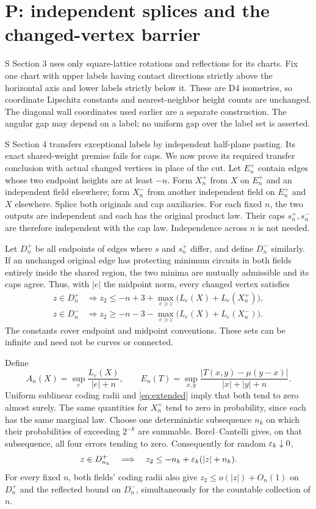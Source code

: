 \section{P: independent splices and the changed-vertex barrier}\label{sec:splice}
S Section 3 uses only square-lattice rotations and reflections for its charts.
Fix one chart with upper labels having contact directions strictly above
the horizontal axis and lower labels strictly below it. These are D4
isometries, so coordinate Lipschitz constants and nearest-neighbor height
counts are unchanged. The diagonal wall coordinates used earlier are a
separate construction. The angular gap may depend on a label; no uniform
gap over the label set is asserted.

S Section 4 transfers exceptional labels by independent half-plane pasting.
Its exact shared-weight premise fails for caps. We now prove its required
transfer conclusion with actual changed vertices in place of the cut.
Let $E_n^+$ contain edges whose two endpoint heights are at least $-n$.
Form $X_n^+$ from $X$ on $E_n^+$ and an independent field elsewhere; form
$X_n^-$ from another independent field on $E_n^+$ and $X$ elsewhere.
Splice both originals and cap auxiliaries. For each fixed $n$, the two outputs
are independent and each has the original product law. Their caps $s_n^+,s_n^-$
are therefore independent with the cap law. Independence across $n$ is not needed.

Let $D_n^+$ be all endpoints of edges where $s$ and $s_n^+$ differ, and
define $D_n^-$ similarly. If an unchanged original edge has protecting
minimum circuits in both fields entirely inside the shared region, the
two minima are mutually admissible and its caps agree. Thus, with $|e|$
the midpoint norm, every changed vertex satisfies
\begin{align}
 z\in D_n^+&\Longrightarrow z_2\le-n+3+
       \max_{e\ni z}\big(L_e(X)+L_e(X_n^+)\big),\label{eq:band}\\
 z\in D_n^-&\Longrightarrow z_2\ge-n-3-
       \max_{e\ni z}\big(L_e(X)+L_e(X_n^-)\big).\nonumber
\end{align}
The constants cover endpoint and midpoint conventions. These sets can be
infinite and need not be curves or connected.

Define
\[
 A_n(X)=\sup_e\frac{L_e(X)}{|e|+n},\qquad
 E_n(T)=\sup_{x,y}\frac{|T(x,y)-\mu(y-x)|}{|x|+|y|+n}.
\]
Uniform sublinear coding radii and \eqref{eq:extended} imply that both tend
to zero almost surely. The same quantities for $X_n^+$ tend to zero in
probability, since each has the same marginal law. Choose one deterministic
subsequence $n_k$ on which their probabilities of exceeding $2^{-k}$ are
summable. Borel--Cantelli gives, on that subsequence, all four errors tending
to zero. Consequently for random $\varepsilon_k\downarrow0$,
\begin{equation}\label{eq:movingband}
 z\in D_{n_k}^+\quad\Longrightarrow\quad
 z_2\le-n_k+\varepsilon_k(|z|+n_k).
\end{equation}
For every fixed $n$, both fields' coding radii also give
$z_2\le o(|z|)+O_n(1)$ on $D_n^+$ and the reflected bound on $D_n^-$,
simultaneously for the countable collection of $n$.

